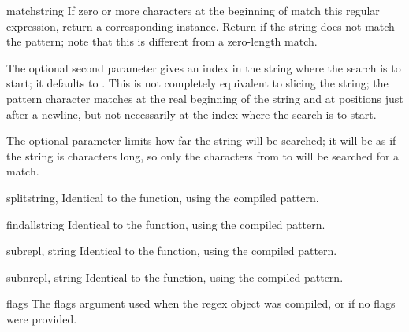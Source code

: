 \begin{methoddesc}[RegexObject]{match}{string}
  If zero or more characters at the beginning of  match
  this regular expression, return a corresponding
   instance.  Return  if the string does not
  match the pattern; note that this is different from a zero-length
  match.
  
  The optional second parameter  gives an index in the string
  where the search is to start; it defaults to .  This is not
  completely equivalent to slicing the string; the  pattern
  character matches at the real beginning of the string and at positions
  just after a newline, but not necessarily at the index where the search
  is to start.

  The optional parameter  limits how far the string will
  be searched; it will be as if the string is  characters
  long, so only the characters from  to  will be
  searched for a match.
\end{methoddesc}

\begin{methoddesc}[RegexObject]{split}{string, }
Identical to the  function, using the compiled pattern.
\end{methoddesc}

\begin{methoddesc}[RegexObject]{findall}{string}
Identical to the  function, using the compiled pattern.
\end{methoddesc}

\begin{methoddesc}[RegexObject]{sub}{repl, string}
Identical to the  function, using the compiled pattern.
\end{methoddesc}

\begin{methoddesc}[RegexObject]{subn}{repl, string}
Identical to the  function, using the compiled pattern.
\end{methoddesc}


\begin{memberdesc}[RegexObject]{flags}
The flags argument used when the regex object was compiled, or
 if no flags were provided.
\end{memberdesc}

